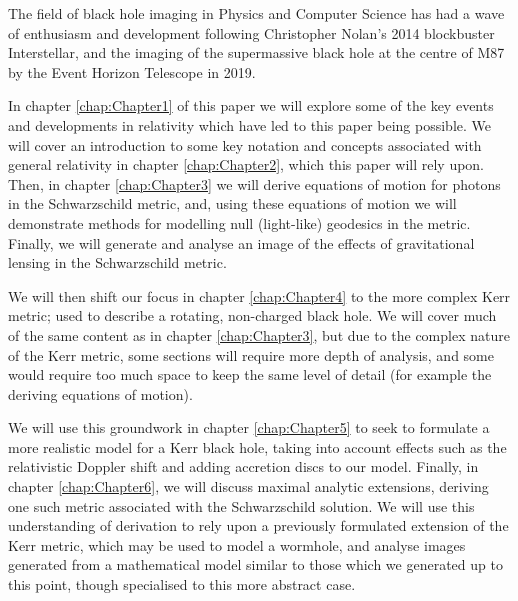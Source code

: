 \documentclass[oneside,openright,frontopenright, singlespacing]{dmathesis}
\begin{document}
%
%
%
%
\begin{introduction}

	The field of black hole imaging in Physics and Computer Science has had a wave of enthusiasm and development following Christopher Nolan’s 2014 blockbuster Interstellar\cite{Interstellar}, and the imaging of the supermassive black hole at the centre of M87 by the Event Horizon Telescope in 2019\cite{event2019first}.

\vspace{1em}
	 In chapter \ref{chap:Chapter1} of this paper we will explore some of the key events and developments in relativity which have led to this paper being possible. We will cover an introduction to some key notation and concepts associated with general relativity in chapter \ref{chap:Chapter2}, which this paper will rely upon. Then, in chapter \ref{chap:Chapter3} we will derive equations of motion for photons in the Schwarzschild metric, and, using these equations of motion we will demonstrate methods for modelling null (light-like) geodesics in the metric. Finally, we will generate and analyse an image of the effects of gravitational lensing in the Schwarzschild metric.

\vspace{1em}
	We will then shift our focus in chapter \ref{chap:Chapter4} to the more complex Kerr metric; used to describe a rotating, non-charged black hole. We will cover much of the same content as in chapter \ref{chap:Chapter3}, but due to the complex nature of the Kerr metric, some sections will require more depth of analysis, and some would require too much space to keep the same level of detail (for example the deriving equations of motion).

\vspace{1em}
	We will use this groundwork in chapter \ref{chap:Chapter5} to seek to formulate a more realistic model for a Kerr black hole, taking into account effects such as the relativistic Doppler shift and adding accretion discs to our model. Finally, in chapter \ref{chap:Chapter6}, we will discuss maximal analytic extensions, deriving one such metric associated with the Schwarzschild solution. We will use this understanding of derivation to rely upon a previously formulated extension of the Kerr metric, which may be used to model a wormhole, and analyse images generated from a mathematical model similar to those which we generated up to this point, though specialised to this more abstract case. 

\vspace{1em}
	

\end{introduction}
\end{document}
